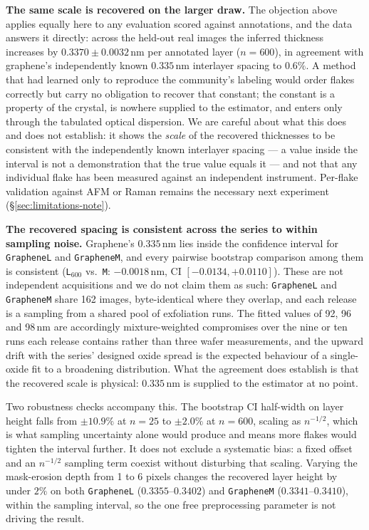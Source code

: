 \documentclass[10pt]{article}
\begin{document}
\textbf{The same scale is recovered on the larger draw.} The objection above applies equally here to any evaluation scored against annotations, and the data answers it directly: across the held-out real images the inferred thickness increases by $0.3370 \pm 0.0032$\,nm per annotated layer ($n{=}600$), in agreement with graphene's independently known $0.335$\,nm interlayer spacing to $0.6\%$. A method that had learned only to reproduce the community's labeling would order flakes correctly but carry no obligation to recover that constant; the constant is a property of the crystal, is nowhere supplied to the estimator, and enters only through the tabulated optical dispersion. We are careful about what this does and does not establish: it shows the \emph{scale} of the recovered thicknesses to be consistent with the independently known interlayer spacing --- a value inside the interval is not a demonstration that the true value equals it --- and not that any individual flake has been measured against an independent instrument. Per-flake validation against AFM or Raman remains the necessary next experiment (\S\ref{sec:limitations-note}).

\textbf{The recovered spacing is consistent across the series to within sampling noise.} Graphene's $0.335$\,nm lies inside the confidence interval for \texttt{GrapheneL} and \texttt{GrapheneM}, and every pairwise bootstrap comparison among them is consistent (\texttt{L}$_{600}$ vs.\ \texttt{M}: $-0.0018$\,nm, CI $[-0.0134,+0.0110]$). These are not independent acquisitions and we do not claim them as such: \texttt{GrapheneL} and \texttt{GrapheneM} share 162 images, byte-identical where they overlap, and each release is a sampling from a shared pool of exfoliation runs. The fitted values of 92, 96 and 98\,nm are accordingly mixture-weighted compromises over the nine or ten runs each release contains rather than three wafer measurements, and the upward drift with the series' designed oxide spread is the expected behaviour of a single-oxide fit to a broadening distribution. What the agreement does establish is that the recovered scale is physical: $0.335$\,nm is supplied to the estimator at no point.

Two robustness checks accompany this. The bootstrap CI half-width on layer height falls from $\pm10.9\%$ at $n{=}25$ to $\pm2.0\%$ at $n{=}600$, scaling as $n^{-1/2}$, which is what sampling uncertainty alone would produce and means more flakes would tighten the interval further. It does not exclude a systematic bias: a fixed offset and an $n^{-1/2}$ sampling term coexist without disturbing that scaling. Varying the mask-erosion depth from 1 to 6 pixels changes the recovered layer height by under $2\%$ on both \texttt{GrapheneL} ($0.3355$--$0.3402$) and \texttt{GrapheneM} ($0.3341$--$0.3410$), within the sampling interval, so the one free preprocessing parameter is not driving the result.
\end{document}

